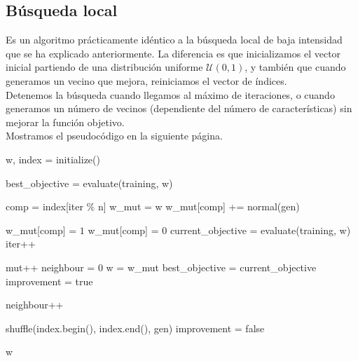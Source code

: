 \documentclass[12pt]{article}
\begin{document}
\subsection*{{\color{red} Búsqueda local}}

Es un algoritmo prácticamente idéntico a la búsqueda local de baja intensidad que se ha explicado anteriormente. La diferencia es que inicializamos el vector inicial partiendo de una distribución uniforme $\mathcal U(0,1)$, y también que cuando generamos un vecino que mejora, reiniciamos el vector de índices. \\

Detenemos la búsqueda cuando llegamos al máximo de iteraciones, o cuando generamos un número de vecinos (dependiente del número de características) sin mejorar la función objetivo.\\

Mostramos el pseudocódigo en la siguiente página.

\newpage

\begin{algorithm}[h!]
\begin{algorithmic}


\State w, index = initialize()

\State best\_objective = evaluate(training, w)

    \State comp = index[iter $\%$ n]
    \State w\_mut = w
    \State w\_mut[comp] += normal(gen)
    
     \State w\_mut[comp] = $1$
     \State w\_mut[comp] = $0$
    \EndIf
    \State current\_objective = evaluate(training, w)
    \State iter++

      \State mut++
      \State neighbour = $0$
      \State w = w\_mut
      \State best\_objective = current\_objective
      \State improvement = true

    \Else 
      \State neighbour++
    \EndIf

      \State shuffle(index.begin(), index.end(), gen)
      \State improvement = false
    \EndIf
  \EndWhile
      
\State \Return w
\EndFunction

\end{algorithmic}
\end{algorithm}
\end{document}
